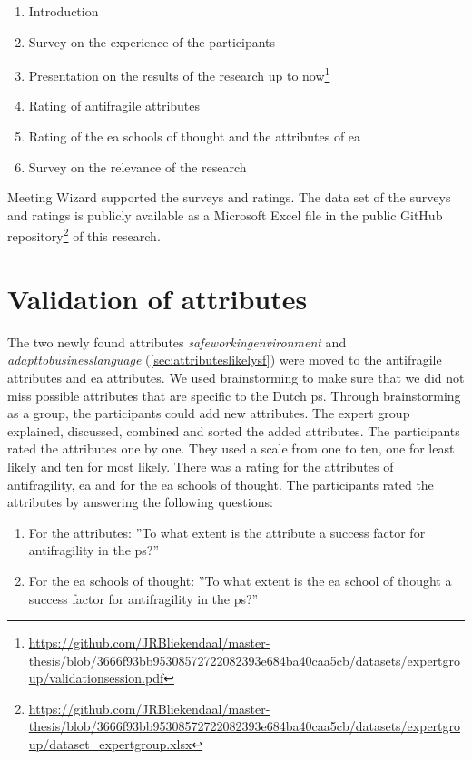\begin{enumerate}
	\item{Introduction}
	\item{Survey on the experience of the participants}
	\item{Presentation on the results of the research up to now\footnote{\url{https://github.com/JRBliekendaal/master-thesis/blob/3666f93bb95308572722082393e684ba40caa5cb/datasets/expertgroup/validationsession.pdf}}}
	\item{Rating of \gls{antifragile} \glspl{attribute}}
	\item{Rating of the \gls{ea} schools of thought and the \glspl{attribute} of \gls{ea}}
	\item{Survey on the relevance of the research}
\end{enumerate}
Meeting Wizard supported the surveys and ratings. The data set of the surveys and ratings is publicly available as a Microsoft Excel file in the public GitHub repository\footnote{\url{https://github.com/JRBliekendaal/master-thesis/blob/3666f93bb95308572722082393e684ba40caa5cb/datasets/expertgroup/dataset_expertgroup.xlsx}} of this research.
\section{Validation of attributes}
\label{sec:validationofattributes}
The two newly found attributes \textit{\gls{safeworkingenvironment}} and \textit{\gls{adapttobusinesslanguage}} (\cref{sec:attributeslikelysf}) were moved to the \gls{antifragile} \glspl{attribute} and \gls{ea} \glspl{attribute}. We used brainstorming to make sure that we did not miss possible \glspl{attribute} that are specific to the Dutch \gls{ps}. Through brainstorming as a group, the participants could add new \glspl{attribute}. The expert group explained, discussed, combined and sorted the added \glspl{attribute}. The participants rated the \glspl{attribute} one by one. They used a scale from one to ten, one for least likely and ten for most likely. There was a rating for the \glspl{attribute} of \gls{antifragility}, \gls{ea} and for the \gls{ea} schools of thought. The participants rated the \glspl{attribute} by answering the following questions:
\begin{enumerate}
	\item{For the \glspl{attribute}: ''To what extent is the \gls{attribute} a success factor for \gls{antifragility} in the \gls{ps}?''}
	\item{For the \gls{ea} schools of thought: ''To what extent is the \gls{ea} school of thought a success factor for \gls{antifragility} in the \gls{ps}?''}
\end{enumerate}
